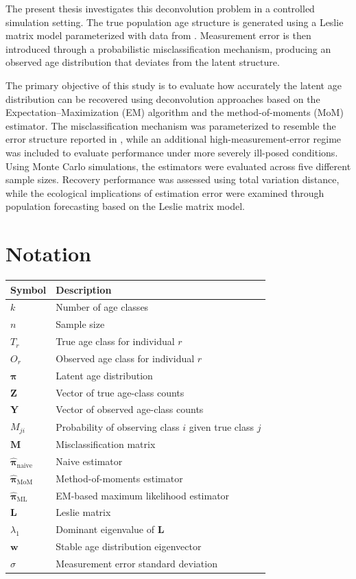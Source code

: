 \documentclass[11pt,a4paper]{article}
\begin{document}
The present thesis investigates this deconvolution problem in a controlled simulation setting. The true population age structure is generated using a Leslie matrix model parameterized with data from \parencite{nina_bearmodel}. Measurement error is then introduced through a probabilistic misclassification mechanism, producing an observed age distribution that deviates from the latent structure.

The primary objective of this study is to evaluate how accurately the latent age distribution can be recovered using deconvolution approaches based on the Expectation--Maximization (EM) algorithm and the method-of-moments (MoM) estimator. The misclassification mechanism  was parameterized to resemble the error structure reported in \parencite{nakamura2023}, while an additional high-measurement-error regime was included to evaluate performance under more severely ill-posed conditions. Using Monte Carlo simulations, the estimators were evaluated across five different sample sizes. Recovery performance was assessed using total variation distance, while the ecological implications of estimation error were examined through population forecasting based on the Leslie matrix model.

\section*{Notation}

\begin{table}[H]
	\centering
	\begin{tabular}{ll}
		\toprule
		Symbol & Description \\
		\midrule
		$k$ & Number of age classes \\
		$n$ & Sample size \\
		$T_r$ & True age class for individual $r$ \\
		$O_r$ & Observed age class for individual $r$ \\
		$\boldsymbol{\pi}$ & Latent age distribution \\
		$\mathbf{Z}$ & Vector of true age-class counts \\
		$\mathbf{Y}$ & Vector of observed age-class counts \\
		$M_{ji}$ & Probability of observing class $i$ given true class $j$ \\
		$\mathbf{M}$ & Misclassification matrix \\
		$\hat{\boldsymbol{\pi}}_{\text{naive}}$ & Naive estimator \\
		$\hat{\boldsymbol{\pi}}_{\text{MoM}}$ & Method-of-moments estimator \\
		$\hat{\boldsymbol{\pi}}_{\text{ML}}$ & EM-based maximum likelihood estimator \\
		$\mathbf{L}$ & Leslie matrix \\
		$\lambda_1$ & Dominant eigenvalue of $\mathbf{L}$ \\
		$\mathbf{w}$ & Stable age distribution eigenvector \\
		$\sigma$ & Measurement error standard deviation \\
		\bottomrule
	\end{tabular}
\end{table}
\end{document}
